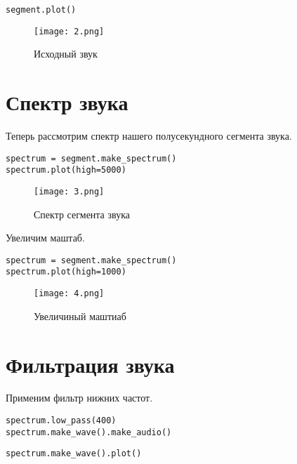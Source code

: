 \documentclass[a4paper,12pt]{report}
\begin{document}
\begin{lstlisting}[caption=Визуализация укороченного звука]
segment.plot()
\end{lstlisting}

\begin{figure}[H]
        \centering
        \texttt{[image: 2.png]}
        \caption{Исходный звук}
        \label{fig: fig2_2}
\end{figure}

\section{Спектр звука}

Теперь рассмотрим спектр нашего полусекундного сегмента звука.

\begin{lstlisting}[caption=Спектр сегмента звука]
spectrum = segment.make_spectrum()
spectrum.plot(high=5000)
\end{lstlisting}

\begin{figure}[H]
        \centering
        \texttt{[image: 3.png]}
        \caption{Спектр сегмента звука}
        \label{fig:fig2_3}
\end{figure}

Увеличим маштаб.

\begin{lstlisting}[caption=Основные и доминирующие частоты]
spectrum = segment.make_spectrum()
spectrum.plot(high=1000)
\end{lstlisting}

\begin{figure}[H]
        \centering
        \texttt{[image: 4.png]}
        \caption{Увеличиный маштиаб}
        \label{fig:fig2_4}
\end{figure}

\section{Фильтрация звука}

Применим фильтр нижних частот.

\begin{lstlisting}[caption=Фильтрация и воспроизведение звука]
spectrum.low_pass(400)
spectrum.make_wave().make_audio()
\end{lstlisting}

\begin{lstlisting}[caption=Визуализация фильтрации]
spectrum.make_wave().plot()
\end{lstlisting}
\end{document}
